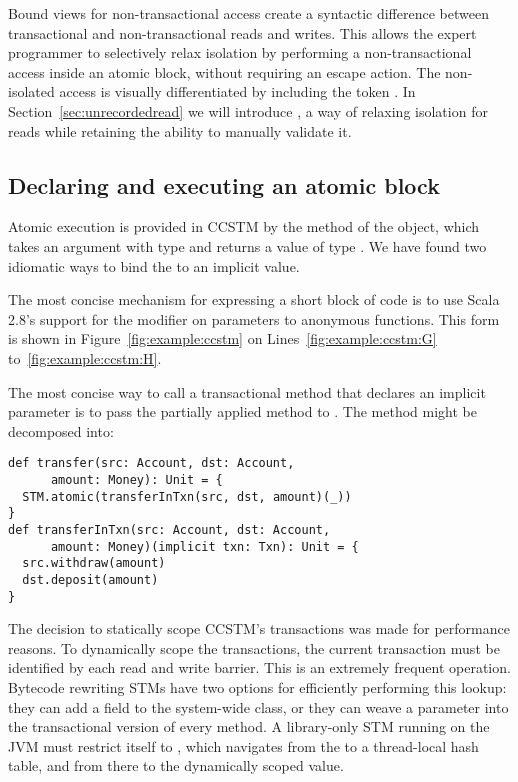 Bound views for non-transactional access create a syntactic difference
between transactional and non-transactional reads and writes.
This allows the expert programmer to selectively relax isolation by
performing a non-transactional access inside an atomic block, without
requiring an escape action.  The non-isolated access
is visually differentiated by including the token .  In
Section~\ref{sec:unrecordedread} we will introduce ,
a way of relaxing isolation for reads while retaining the ability to
manually validate it.

\subsection{Declaring and executing an atomic block}

Atomic execution is provided in CCSTM by the  method of
the  object, which takes an argument with type
 and returns a value of type .
We have found two idiomatic ways to bind the  to an implicit
value.

The most concise mechanism for expressing a short block of code is to use
Scala 2.8's support for the  modifier on parameters to
anonymous functions.  This form is shown in Figure~\ref{fig:example:ccstm}
on Lines~\ref{fig:example:ccstm:G} to~\ref{fig:example:ccstm:H}.

The most concise way to call a transactional method that declares an implicit
 parameter is to pass the partially applied method to
.  The  method
might be decomposed into:
\lstset{numbers=none}
\begin{lstlisting}
def transfer(src: Account, dst: Account,
      amount: Money): Unit = {
  STM.atomic(transferInTxn(src, dst, amount)(_))
}
def transferInTxn(src: Account, dst: Account,
      amount: Money)(implicit txn: Txn): Unit = {
  src.withdraw(amount)
  dst.deposit(amount)
}
\end{lstlisting}
\lstset{numbers=left}


The decision to statically scope CCSTM's transactions was made for
performance reasons.  To dynamically scope the transactions, the
current transaction must be identified by each read and write barrier.
This is an extremely frequent operation.  Bytecode rewriting STMs have
two options for efficiently performing this lookup: they can add a field
to the system-wide  class, or they can weave a 
parameter into the transactional version of every method.  A library-only
STM running on the JVM must restrict itself to ,
which navigates from the  to a thread-local hash table,
and from there to the dynamically scoped value.

